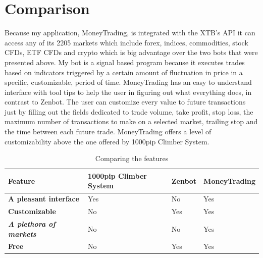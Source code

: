 \documentclass[12pt,a4paper]{report}
\begin{document}
\section{Comparison}
Because my application, MoneyTrading, is integrated with the XTB's API it can access any of its 2205 markets which include forex, indices, commodities, stock CFDs, ETF CFDs and crypto which is big advantage over the two bots that were presented above. My bot is a signal based program because it executes trades based on indicators triggered by a certain amount of fluctuation in price in a specific, customizable, period of time. MoneyTrading has an easy to understand interface with tool tips to help the user in figuring out what everything does, in contrast to Zenbot. The user can customize every value to future transactions just by filling out the fields dedicated to trade volume, take profit, stop loss, the maximum number of transactions to make on a selected market, trailing stop and the time between each future trade. MoneyTrading offers a level of customizability above the one offered by 1000pip Climber System.
\break
\renewcommand{\arraystretch}{1.5}
\begin{table}[th]\small\linespread{1}
	\begin{tabular}{l >{\raggedright\arraybackslash}p{3.5cm} >{\raggedright\arraybackslash}p{3.5cm} >{\raggedright\arraybackslash}p{3.5cm}}
		\textbf{Feature} & \textbf{1000pip Climber System} & \textbf{Zenbot} &\textbf{MoneyTrading} \\ [0.5cm]\hline
		\textbf{A pleasant interface} & Yes & No & Yes \\[0.5cm]\hline
		\textbf{Customizable} & No & Yes & Yes \\ [0.5cm]\hline
		\textbf{\textit{A plethora of markets}} & No & No & Yes \\ [0.5cm]\hline
		\textbf{Free} & No & Yes & Yes\\ [0.5cm]\hline
	\end{tabular}
	\caption{Comparing the features}
	\label{tab:comparsion}
\end{table} 
\end{document}
